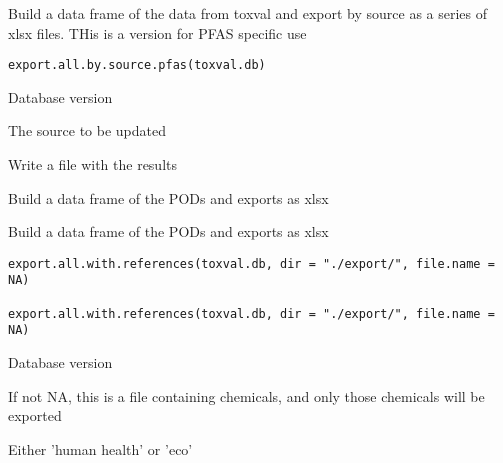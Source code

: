 \documentclass[letterpaper]{book}
\begin{document}
%
\begin{Description}\relax
Build a data frame of the data from toxval and export by source as a
series of xlsx files. THis is a version for PFAS specific use
\end{Description}
%
\begin{Usage}
\begin{verbatim}
export.all.by.source.pfas(toxval.db)
\end{verbatim}
\end{Usage}
%
\begin{Arguments}
\begin{ldescription}
\item[\code{toxval.db}] Database version

\item[\code{source}] The source to be updated
\end{ldescription}
\end{Arguments}
%
\begin{Value}
Write a file with the results
\end{Value}
%
\begin{Description}\relax
Build a data frame of the PODs and exports as xlsx

Build a data frame of the PODs and exports as xlsx
\end{Description}
%
\begin{Usage}
\begin{verbatim}
export.all.with.references(toxval.db, dir = "./export/", file.name = NA)

export.all.with.references(toxval.db, dir = "./export/", file.name = NA)
\end{verbatim}
\end{Usage}
%
\begin{Arguments}
\begin{ldescription}
\item[\code{toxval.db}] Database version

\item[\code{file.name}] If not NA, this is a file containing chemicals, and only those chemicals will be exported

\item[\code{human\_eco}] Either 'human health' or 'eco'
\end{ldescription}
\end{Arguments}
\end{document}
